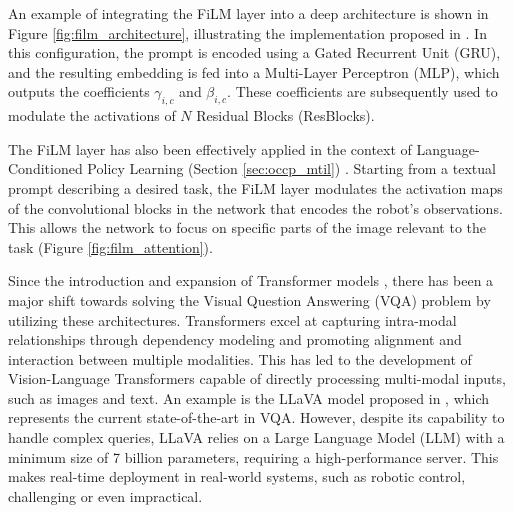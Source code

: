 An example of integrating the FiLM layer into a deep architecture is shown in Figure \ref{fig:film_architecture}, illustrating the implementation proposed in \cite{perez2018film}. In this configuration, the prompt is encoded using a Gated Recurrent Unit (GRU), and the resulting embedding is fed into a Multi-Layer Perceptron (MLP), which outputs the coefficients $\gamma_{i,c}$ and $\beta_{i,c}$. These coefficients are subsequently used to modulate the activations of $N$ Residual Blocks (ResBlocks).


The FiLM layer has also been effectively applied in the context of Language-Conditioned Policy Learning (Section \ref{sec:occp_mtil}) \cite{jang2022bc_z,brohan2022rt}. Starting from a textual prompt describing a desired task, the FiLM layer modulates the activation maps of the convolutional blocks in the network that encodes the robot's observations. This allows the network to focus on specific parts of the image relevant to the task (Figure \ref{fig:film_attention}).


Since the introduction and expansion of Transformer models \cite{vaswani2017attention}, there has been a major shift towards solving the Visual Question Answering (VQA) problem by utilizing these architectures. Transformers excel at capturing intra-modal relationships through dependency modeling and promoting alignment and interaction between multiple modalities. This has led to the development of Vision-Language Transformers capable of directly processing multi-modal inputs, such as images and text. An example is the LLaVA model proposed in \cite{liu2024visual}, which represents the current state-of-the-art in VQA. However, despite its capability to handle complex queries, LLaVA relies on a Large Language Model (LLM) with a minimum size of 7 billion parameters, requiring a high-performance server. This makes real-time deployment in real-world systems, such as robotic control, challenging or even impractical.
